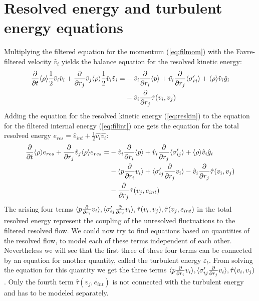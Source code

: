 \section{Resolved energy and turbulent energy equations}
Multiplying the filtered equation for the momentum (\ref{eq:filmom}) with the
Favre-filtered velocity
$\hat{v}_i$ yields the balance equation for the resolved kinetic energy:
\begin{align}
\begin{split}
\frac{\partial}{\partial t}\langle \rho \rangle\frac{1}{2}\hat{v}_i\hat{v}_i 
+ \frac{\partial}{\partial r_j}\hat{v}_j\langle \rho \rangle\frac{1}{2}\hat{v}_i\hat{v}_i =&
-\hat{v}_i\frac{\partial}{\partial r_i}\langle p \rangle+\hat{v_i}\frac{\partial}{\partial r_j}\langle \sigma'_{ij} \rangle
+\langle \rho \rangle\hat{v}_i\hat{g}_i\\
&-\hat{v}_i\frac{\partial}{\partial r_j}\hat{\tau}(v_i,v_j) \label{eq:reskin}
\end{split}
\end{align}
Adding the equation for the resolved kinetic energy (\ref{eq:reskin}) to the
equation for the filtered internal energy (\ref{eq:filint}) one gets the
equation for the total resolved
energy $e_{res}=\hat{e}_{int}+\frac{1}{2}\hat{v_i}\hat{v_i}$:
\begin{align}
\begin{split}
\frac{\partial}{\partial t}\langle \rho \rangle e_{res}+\frac{\partial}{\partial r_j}\hat{v}_j\langle \rho \rangle e_{res}=&
-\hat{v}_i\frac{\partial}{\partial r_i}\langle p \rangle+\hat{v}_i\frac{\partial}{\partial r_j}\langle \sigma'_{ij} \rangle+\langle \rho \rangle\hat{v}
_i\hat{g}_i\\
&-\langle p\frac{\partial}{\partial r_i}v_i \rangle+\langle \sigma'_{ij}\frac{\partial}{\partial r_j}v_i \rangle
-\hat{v}_i\frac{\partial}{\partial r_j}\hat{\tau}(v_i,v_j)\\
&-\frac{\partial}{\partial r_j}\hat{\tau}(v_j,e_{int})\label{eq:resetot}
\end{split}
\end{align}
The arising four terms
$\langle p\frac{\partial}{\partial r_i}v_i \rangle,\langle \sigma'_{ij}\frac{\partial}{\partial r_j}v_i \rangle,
\hat{\tau}(v_i,v_j),\hat{\tau}(v_j,e_{int})$ in the total resolved energy
represent the coupling of the unresolved fluctuations to the filtered resolved
flow. We could now try to find equations based on quantities of the resolved
flow, to model each of these terms independent of each other.
Nevertheless we will see that the first three of these four terms can be
connected by an equation for another quantity, called the turbulent energy 
$\varepsilon_t$. From solving the equation for this quantity we get the three
terms $\langle p\frac{\partial}{\partial r_i}v_i \rangle,\langle \sigma'_{ij}\frac{\partial}{\partial r_j}v_i \rangle,\hat{\tau}(v_i,v_j)$.
Only the fourth term $\hat{\tau}(v_j,e_{int})$ is not connected with the
turbulent energy and has to be modeled separately. 

